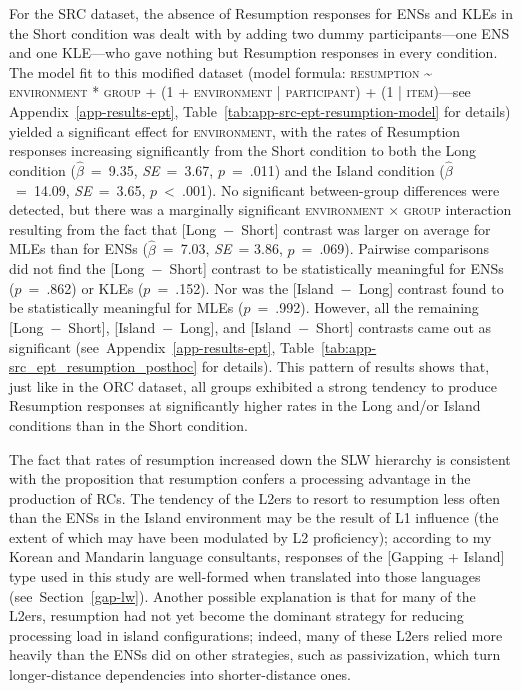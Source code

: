 For the SRC dataset, the absence of Resumption responses for ENSs and KLEs in the Short condition was dealt with by adding two dummy participants---one ENS and one KLE---who gave nothing but Resumption responses in every condition.\footnotemark{} The model fit to this modified dataset (model formula: \textsc{resumption \~{} environment * group + (1 + environment | participant) + (1 | item)}---see Appendix~\ref{app-results-ept}, Table~\ref{tab:app-src-ept-resumption-model} for details) yielded a significant effect for \textsc{environment}, with the rates of Resumption responses increasing significantly from the Short condition to both the Long condition ($\hat{\beta}$~=~9.35, \textit{SE}~=~3.67, $p$~=~.011) and the Island condition ($\hat{\beta}$~=~14.09, \textit{SE}~=~3.65, $p$~<~.001). No significant between-group differences were detected, but there was a marginally significant \textsc{environment × group} interaction resulting from the fact that [Long~−~Short] contrast was larger on average for MLEs than for ENSs ($\hat{\beta}$~=~7.03, \textit{SE}~= 3.86, $p$~=~.069). Pairwise comparisons did not find the [Long~−~Short] contrast to be statistically meaningful for ENSs ($p$~=~.862) or KLEs ($p$~=~.152). Nor was the [Island~−~Long] contrast found to be statistically meaningful for MLEs ($p$~=~.992). However, all the remaining [Long~−~Short], [Island~−~Long], and [Island~−~Short] contrasts came out as significant (see~Appendix~\ref{app-results-ept}, Table~\ref{tab:app-src_ept_resumption_posthoc} for details). This pattern of results shows that, just like in the ORC dataset, all groups exhibited a strong tendency to produce Resumption responses at significantly higher rates in the Long and/or Island conditions than in the Short condition.


The fact that rates of resumption increased down the SLW hierarchy is consistent with the proposition that resumption confers a processing advantage in the production of RCs. The tendency of the L2ers to resort to resumption less often than the ENSs in the Island environment may be the result of L1 influence (the extent of which may have been modulated by L2 proficiency); according to my Korean and Mandarin language consultants, responses of the [Gapping + Island] type used in this study are well-formed when translated into those languages (see~Section~\ref{gap-lw}). Another possible explanation is that for many of the L2ers, resumption had not yet become the dominant strategy for reducing processing load in island configurations; indeed, many of these L2ers relied more heavily than the ENSs did on other strategies, such as passivization, which turn longer-distance dependencies into shorter-distance ones.

